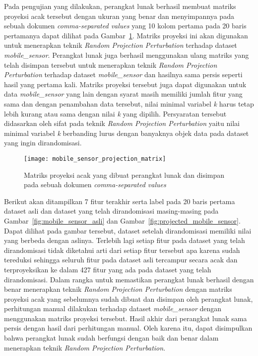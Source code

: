 Pada pengujian yang dilakukan, perangkat lunak berhasil membuat matriks proyeksi acak tersebut dengan ukuran yang benar dan menyimpannya pada sebuah dokumen \textit{comma-separated values} yang 10 kolom pertama pada 20 baris pertamanya dapat dilihat pada Gambar~\ref{fig:mobile_sensor_projection_matrix}. Matriks proyeksi ini akan digunakan untuk menerapkan teknik \textit{Random Projection Perturbation} terhadap dataset \textit{mobile\_sensor}. Perangkat lunak juga berhasil menggunakan ulang matriks yang telah disimpan tersebut untuk menerapkan teknik \textit{Random Projection Perturbation} terhadap dataset \textit{mobile\_sensor} dan hasilnya sama persis seperti hasil yang pertama kali. Matriks proyeksi tersebut juga dapat digunakan untuk data \textit{mobile\_sensor} yang lain dengan syarat masih memiliki jumlah fitur yang sama dan dengan penambahan data tersebut, nilai minimal variabel \textit{k} harus tetap lebih kurang atau sama dengan nilai \textit{k} yang dipilih. Persyaratan tersebut didasarkan oleh sifat pada teknik \textit{Random Projection Perturbation} yaitu nilai minimal variabel \textit{k} berbanding lurus dengan banyaknya objek data pada dataset yang ingin dirandomisasi.

\begin{figure}
	\centering
	\texttt{[image: mobile\_sensor\_projection\_matrix]}
	\caption{Matriks proyeksi acak yang dibuat perangkat lunak dan disimpan pada sebuah dokumen  \textit{comma-separated values}}
	\label{fig:mobile_sensor_projection_matrix}
\end{figure}

Berikut akan ditampilkan 7 fitur terakhir serta label pada 20 baris pertama dataset asli dan dataset yang telah dirandomisasi masing-masing pada Gambar~\ref{fig:mobile_sensor_asli} dan Gambar~\ref{fig:projected_mobile_sensor}. Dapat dilihat pada gambar tersebut, dataset setelah dirandomisasi memiliki nilai yang berbeda dengan aslinya. Terlebih lagi setiap fitur pada dataset yang telah dirandomisasi tidak diketahui arti dari setiap fitur tersebut apa karena sudah tereduksi sehingga seluruh fitur pada dataset asli tercampur secara acak dan terproyeksikan ke dalam 427 fitur yang ada pada dataset yang telah dirandomisasi. Dalam rangka untuk memastikan perangkat lunak berhasil dengan benar menerapkan teknik \textit{Random Projection Perturbation} dengan matriks proyeksi acak yang sebelumnya sudah dibuat dan disimpan oleh perangkat lunak, perhitungan manual dilakukan terhadap dataset \textit{mobile\_sensor} dengan menggunakan matriks proyeksi tersebut. Hasil akhir dari perangkat lunak sama persis dengan hasil dari perhitungan manual. Oleh karena itu, dapat disimpulkan bahwa perangkat lunak sudah berfungsi dengan baik dan benar dalam menerapkan teknik \textit{Random Projection Perturbation}.

